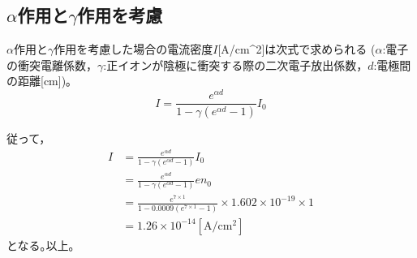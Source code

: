 \documentclass[a4paper, twocolumn]{ltjsarticle}
\begin{document}
  \subsection*{\(\alpha\)作用と\(\gamma\)作用を考慮}
    \(\alpha\)作用と\(\gamma\)作用を考慮した場合の電流密度\(I\)[A/cm^2]は次式で求められる (\(\alpha\):電子の衝突電離係数，\(\gamma\):正イオンが陰極に衝突する際の二次電子放出係数，\(d\):電極間の距離[cm])｡
    \begin{equation}
      I = \frac{e^{\alpha d}}{1-\gamma (e^{\alpha d} - 1)} I_0
      \label{equation:gamma_I}
    \end{equation}

    従って，
    \begin{equation}
      \begin{split}
        I &= \frac{e^{\alpha d}}{1-\gamma (e^{\alpha d} - 1)} I_0 \\
          &= \frac{e^{\alpha d}}{1-\gamma (e^{\alpha d} - 1)} e n_0 \\
          &= \frac{e^{7 \times 1}}{1 - 0.0009(e^{7 \times 1} - 1)} \times 1.602 \times 10^{-19} \times 1 \\
          &= 1.26 \times 10^{-14} [\si{\ampere} / \si{\centi \meter ^ 2}]
      \end{split}
      \label{equation:gamma_I_answer}
    \end{equation}
    となる｡以上｡



\end{document}
